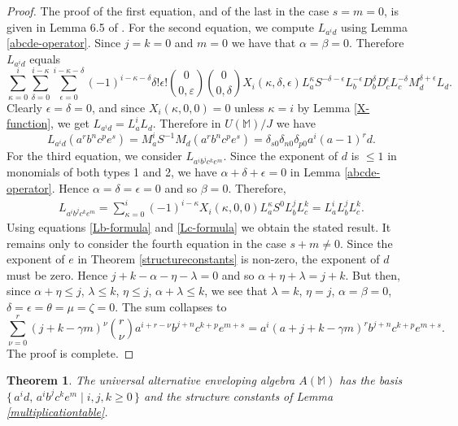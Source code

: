 \documentclass{amsart}
\theoremstyle{plain}
\newtheorem{theorem}[lemma]{Theorem}
\theoremstyle{definition}
\begin{document}
\begin{proof}
The proof of the first equation, and of the last in the case $s = m = 0$, is
given in Lemma 6.5 of \cite{BHPU}. For the second equation, we compute $L_{a^i
d}$ using Lemma \ref{abcde-operator}. Since $j=k=0$ and $m=0$ we have that
$\alpha=\beta=0$. Therefore $L_{a^i d}$ equals
  \[
  \sum_{\kappa=0}^i
  \sum_{\delta=0}^{i-\kappa}
  \sum_{\epsilon=0}^{i-\kappa-\delta}
  (-1)^{i-\kappa-\delta}
  \delta!
  \epsilon!
  \binom{0}{0,\varepsilon}
  \binom{0}{0,\delta}
  X_i(\kappa,\delta,\epsilon)
  L_a^{\kappa}
  S^{-\delta-\epsilon}
  L_b^{-\epsilon}
  D_b^{\delta}
  D_c^{\epsilon}
  L_c^{-\delta}
  M_d^{\delta+\epsilon}
  L_d.
  \]
Clearly $\epsilon = \delta = 0$, and since $X_i(\kappa, 0, 0) = 0$ unless
$\kappa = i$ by Lemma \ref{X-function}, we get $L_{a^i d} = L^i_a L_d$.
Therefore in $U(\mathbb{M})/J$ we have
  \[
  L_{a^i d} ( a^r b^n c^p e^s )
  =
  M_a^i S^{-1} M_d ( a^r b^n c^p e^s )
  =
  \delta_{s0} \delta_{n0} \delta_{p0} a^i (a{-}1)^r d.
  \]
For the third equation, we consider $L_{a^i b^j c^k e^m}$. Since the exponent
of $d$ is $\le 1$ in monomials of both types 1 and 2, we have $\alpha + \delta
+ \epsilon = 0$ in Lemma \ref{abcde-operator}. Hence $\alpha = \delta =
\epsilon = 0$ and so $\beta = 0$. Therefore,
  \allowdisplaybreaks
  \begin{align*}
  L_{a^ib^jc^ke^m}
  =
  \sum_{\kappa=0}^i
  (-1)^{i-\kappa}
  X_i(\kappa, 0, 0)
  L_a^{\kappa} S^0 L_b^j L_c^k= L_a^i L_b^j L_c^k.
  \end{align*}
Using equations \eqref{Lb-formula} and \eqref{Lc-formula} we obtain the stated
result.  It remains only to consider the fourth equation in the case $s + m \ne
0$. Since the exponent of $e$ in Theorem \ref{structureconstants} is non-zero,
the exponent of $d$ must be zero. Hence $j + k - \alpha - \eta - \lambda = 0$
and so $\alpha + \eta + \lambda = j + k$. But then, since $\alpha + \eta \le
j$, $\lambda \le k$, $\eta \le j$, $\alpha + \lambda \le k$, we see that
$\lambda = k$, $\eta = j$, $\alpha = \beta = 0$, $\delta = \epsilon = \theta =
\mu = \zeta = 0$. The sum collapses to
  \[
  \sum_{\nu=0}^r
  (j{+}k{-}\gamma m)^{\nu}
  \binom{r}{\nu}
  a^{i+r-\nu}
  b^{j+n}
  c^{k+p}
  e^{m+s}
  =
  a^i (a{+}j{+}k{-}\gamma m)^r b^{j+n} c^{k+p} e^{m+s}.
  \]
The proof is complete.
\end{proof}

\begin{theorem}
The universal alternative enveloping algebra $A(\mathbb{M})$ has the basis $\{
\, a^i d, \, a^i b^j c^k e^m \mid i,j,k \ge 0 \, \}$ and the structure
constants of Lemma \ref{multiplicationtable}.
\end{theorem}
\end{document}
